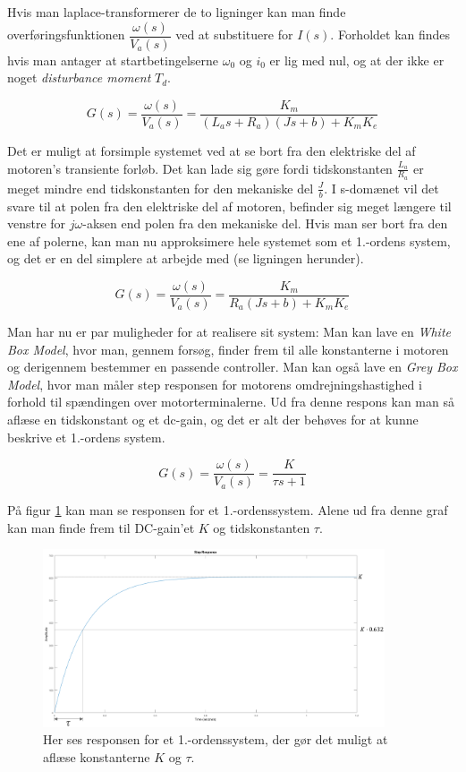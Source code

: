 Hvis man laplace-transformerer de to ligninger kan man finde overføringsfunktionen $\dfrac{\omega(s)}{V_{a}(s)}$ ved at substituere for $I(s)$. Forholdet kan findes hvis man antager at startbetingelserne $\omega_{0}$ og $i_{0}$ er lig med nul, og at der ikke er noget \textit{disturbance moment} $T_{d}$.

\begin{equation}
G(s)=\dfrac{\omega(s)}{V_{a}(s)}=\dfrac{K_{m}}{(L_{a}s+R_{a})(Js+b)+K_{m}K_{e}}
\end{equation}

Det er muligt at forsimple systemet ved at se bort fra den elektriske del af motoren's transiente forløb. Det kan lade sig gøre fordi tidskonstanten $\frac{L_{a}}{R_{a}}$ er meget mindre end tidskonstanten for den mekaniske del $\frac{J}{b}$. I s-domænet vil det svare til at polen fra den elektriske del af motoren, befinder sig meget længere til venstre for $j\omega$-aksen end polen fra den mekaniske del. Hvis man ser bort fra den ene af polerne, kan man nu approksimere hele systemet som et 1.-ordens system, og det er en del simplere at arbejde med (se ligningen herunder).

\begin{equation}
G(s)=\dfrac{\omega(s)}{V_{a}(s)}=\dfrac{K_{m}}{R_{a}(Js+b)+K_{m}K_{e}}
\end{equation}

Man har nu er par muligheder for at realisere sit system: Man kan lave en \textit{White Box Model}, hvor man, gennem forsøg, finder frem til alle konstanterne i motoren og derigennem bestemmer en passende controller. Man kan også lave en \textit{Grey Box Model}, hvor man måler step responsen for motorens omdrejningshastighed i forhold til spændingen over motorterminalerne. Ud fra denne respons kan man så aflæse en tidskonstant og et dc-gain, og det er alt der behøves for at kunne beskrive et 1.-ordens system. 

\begin{equation}\label{eq:tf_pan_tilt}
G(s)=\dfrac{\omega(s)}{V_{a}(s)}=\dfrac{K}{\tau s+1}
\end{equation}

På figur \ref{fig:time_constant} kan man se responsen for et 1.-ordenssystem. Alene ud fra denne graf kan man finde frem til DC-gain'et $K$ og tidskonstanten $\tau$.

\begin{figure}[H]
			\begin{center}
			\includegraphics[width=0.9\textwidth]{Billeder/Time_Constant.PNG}
			\end{center}
			\caption{Her ses responsen for et 1.-ordenssystem, der gør det muligt at aflæse konstanterne $K$ og $\tau$.}
			\label{fig:time_constant}
\end{figure}